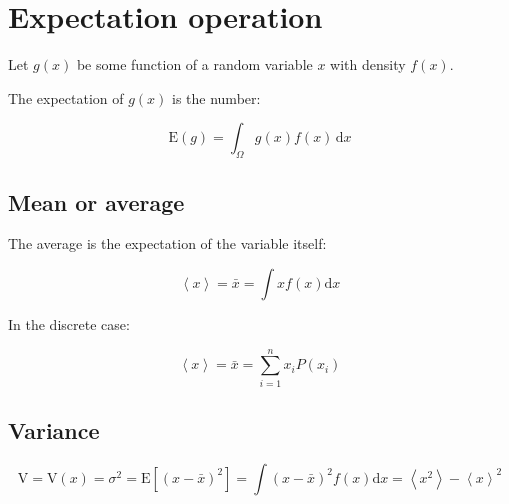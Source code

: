 

\section{Expectation operation}
\label{sec:exp_value}

Let $g(x)$ be some function of a random variable $x$ with density $f(x)$.

The expectation of $g(x)$ is the number:


\begin{equation}\label{eq:exp_value}
	\mathrm{E}\left( g \right) = \int_{\Omega} {g(x) f(x)} \,\mathrm{d}x
\end{equation} 

\subsection{Mean or average}
\label{subsec:mean}

The average is the expectation of the variable itself:

\begin{equation}\label{eq:mean}
	\left \langle x \right \rangle = \bar{x} = \int {x f(x)}\mathrm{d}x
\end{equation}

In the discrete case:

\begin{equation}\label{eq:mean_discrete}
	\left \langle x \right \rangle = \bar{x} = \sum_{i = 1}^{n}{x_{i} P(x_{i})}
\end{equation}

\subsection{Variance}
\label{subsec:variance}

\begin{equation}\label{eq:variance}
	\mathrm{V} = \mathrm{V}\left( x \right) = \sigma^{2} = \mathrm{E}\left[ (x - \bar{x})^{2} \right] 
	= \int {(x - \bar{x})^{2} f(x)}\mathrm{d}x
	= \left \langle x^{2} \right \rangle - {\left \langle x \right \rangle}^2
\end{equation}

